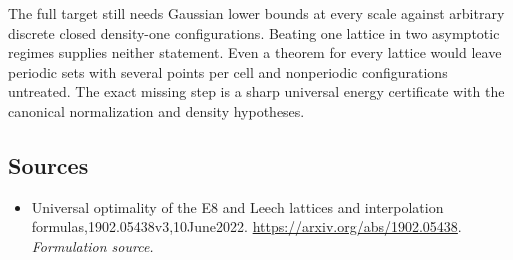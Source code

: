 \documentclass[11pt]{article}
\begin{document}
The full target still needs Gaussian lower bounds at every scale against arbitrary discrete closed density-one configurations. Beating one lattice in two asymptotic regimes supplies neither statement. Even a theorem for every lattice would leave periodic sets with several points per cell and nonperiodic configurations untreated. The exact missing step is a sharp universal energy certificate with the canonical normalization and density hypotheses.

\subsection{Sources}
\begin{itemize}
\item[S1]Universal optimality of the E8 and Leech lattices and interpolation formulas,1902.05438v3,10June2022.
\url{https://arxiv.org/abs/1902.05438}.
\textit{Formulation source.}
\end{itemize}
\end{document}
